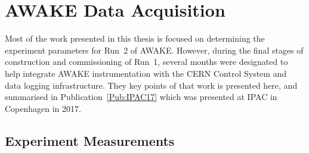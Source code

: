 %
%

\chapter{AWAKE Data Acquisition}
\label{Ch:DAQ}

Most of the work presented in this thesis is focused on determining the experiment parameters for Run~2 of AWAKE.
However, during the final stages of construction and commissioning of Run~1, several months were designated to help integrate AWAKE instrumentation with the CERN Control System and data logging infrastructure.
They key points of that work is presented here, and summarised in Publication~\ref{Pub:IPAC17} which was presented at IPAC in Copenhagen in 2017.

\section{Experiment Measurements}
\label{DAQ:Experiment}

